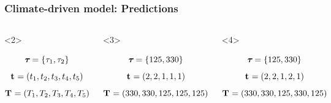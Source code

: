 \begin{frame}
    \frametitle{Climate-driven model: Predictions}
    \begin{columns}[c]
            \begin{onlyenv}<2>
            \begin{displaybox}[4.5cm]
                \[
                    \boldsymbol{\tau_{}} = \{\tau_{1},\tau_{2}\}
                \]\vspace{0mm}
                \[
                    \mathbf{t_{}} = (t_{1},t_{2},t_{3},t_{4},t_{5})
                \]\vspace{0mm}
                {\small
                \[
                    \mathbf{T_{}} = (T_{1},T_{2},T_{3},T_{4},T_{5})
                \]\vspace{0mm}
                }
            \end{displaybox}
            \end{onlyenv}
            \begin{onlyenv}<3>
            \begin{displaybox}[4.5cm]
                \[
                    \boldsymbol{\tau_{}} = \{125,330\}
                \]\vspace{0mm}
                \[
                    \mathbf{t_{}} = (2,2,1,1,1)
                \]\vspace{0mm}
                {\small
                \[
                    \mathbf{T_{}} = (330,330,125,125,125)
                \]\vspace{0mm}
                }
            \end{displaybox}
            \end{onlyenv}
            \begin{onlyenv}<4>
            \begin{displaybox}[4.5cm]
                \[
                    \boldsymbol{\tau_{}} = \{125,330\}
                \]\vspace{0mm}
                \[
                    \mathbf{t_{}} = (2,2,1,2,1)
                \]\vspace{0mm}
                {\small
                \[
                    \mathbf{T_{}} = (330,330,125,330,125)
                \]\vspace{0mm}
                }
            \end{displaybox}
            \end{onlyenv}

\end{columns}
\end{frame}
